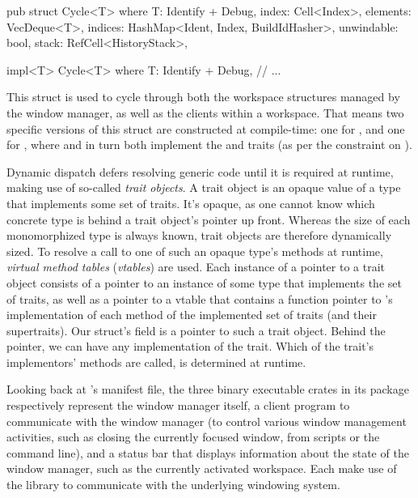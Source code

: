 \begin{rustblock}
  pub struct Cycle<T>
  where
    T: Identify + Debug,
  {
    index: Cell<Index>,
    elements: VecDeque<T>,
    indices: HashMap<Ident, Index, BuildIdHasher>,
    unwindable: bool,
    stack: RefCell<HistoryStack>,
  }

  impl<T> Cycle<T>
  where
      T: Identify + Debug,
  {
    // ...
  }
\end{rustblock}

This struct is used to cycle through both the workspace structures managed
by the window manager, as well as the clients within a workspace. That
means two specific versions of this struct are constructed at compile-time:
one for , and one for , where
 and  in turn both implement the 
and  traits (as per the constraint on ).


Dynamic dispatch defers resolving generic code until it is required at
runtime, making use of so-called \textit{trait objects}\cite{therustbook,
rustdynamicdispatch}. A trait object is an opaque value of a type that
implements some set of traits\cite{therustreference}. It's opaque,
as one cannot know which concrete type is behind a trait object's
pointer up front\cite{therustreference}. Whereas the size of each
monomorphized type is always known, trait objects are therefore dynamically
sized\cite{therustreference}. To resolve a call to one of such an opaque
type's methods at runtime, \textit{virtual method tables} (\textit{vtables})
are used\cite{therustreference}. Each instance of a pointer to a trait object
consists of a pointer to an instance of some type  that implements
the set of traits, as well as a pointer to a vtable that contains a function
pointer to 's implementation of each method of the implemented set of
traits (and their supertraits)\cite{therustreference}. Our  struct's
 field is a pointer to such a trait object. Behind the pointer, we
can have any implementation of the  trait. Which of the trait's
implementors' methods are called, is determined at runtime.

Looking back at \wmrs's manifest file, the three binary executable crates in
its package respectively represent the window manager itself, a client program
to communicate with the window manager (to control various window management
activities, such as closing the currently focused window, from scripts or the
command line), and a status bar that displays information about the state of the
window manager, such as the currently activated workspace. Each make use of the
 library to communicate with the underlying windowing system.

